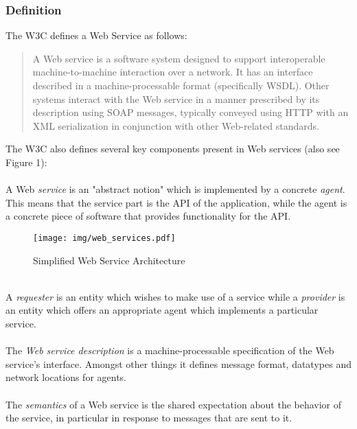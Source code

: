 \subsubsection{Definition}
The W3C defines a Web Service as follows: 
\begin{quote}
A Web service is a software system designed to support interoperable machine-to-machine interaction over a network. It has an interface described in a machine-processable format (specifically WSDL). Other systems interact with the Web service in a manner prescribed by its description using SOAP messages, typically conveyed using HTTP with an XML serialization in conjunction with other Web-related standards. \cite{WSARCH}
\end{quote}
The W3C also defines several key components present in Web services (also see Figure 1):
\\ \\
A Web \emph{service} is an "abstract notion" which is implemented by a concrete \emph{agent}. This means that the service part is the API of the application, while the agent is a concrete piece of software that provides functionality for the API. 
\begin{figure}[htp]
\centering
\texttt{[image: img/web\_services.pdf]}
\caption{Simplified Web Service Architecture}\label{fig:erptsqfit}
\end{figure}
\\
A \emph{requester} is an entity which wishes to make use of a service while a \emph{provider} is an entity which offers an appropriate agent which implements a particular service. 
\\ \\
The \emph{Web service description} is a machine-processable specification of the Web service's interface. Amongst other things it defines message format, datatypes and network locations for agents. 
\\ \\
The \emph{semantics} of a Web service is the shared expectation about the behavior of the service, in particular in response to messages that are sent to it. \cite{WSARCH}

